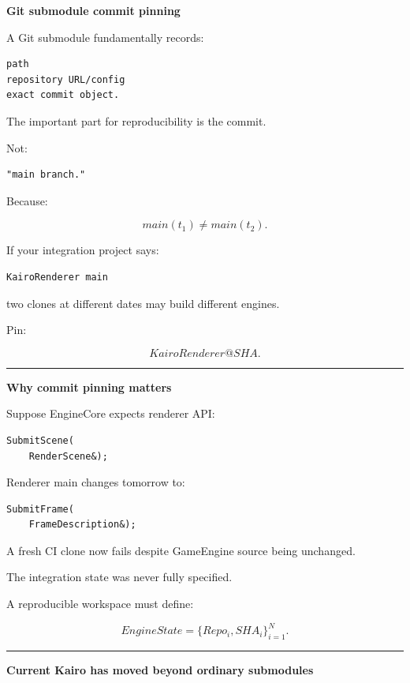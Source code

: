 \textbf{Git submodule commit pinning}

A Git submodule fundamentally records:

\begin{verbatim}
path
repository URL/config
exact commit object.
\end{verbatim}

The important part for reproducibility is the commit.

Not:

\begin{verbatim}
"main branch."
\end{verbatim}

Because:

\[
main(t_1)
\neq
main(t_2).
\]

If your integration project says:

\begin{verbatim}
KairoRenderer main
\end{verbatim}

two clones at different dates may build different engines.

Pin:

\[
KairoRenderer@SHA.
\]

\begin{center}\rule{0.5\linewidth}{0.5pt}\end{center}

\textbf{Why commit pinning matters}

Suppose EngineCore expects renderer API:

\begin{verbatim}
SubmitScene(
    RenderScene&);
\end{verbatim}

Renderer main changes tomorrow to:

\begin{verbatim}
SubmitFrame(
    FrameDescription&);
\end{verbatim}

A fresh CI clone now fails despite GameEngine source being unchanged.

The integration state was never fully specified.

A reproducible workspace must define:

\[
\boxed{
EngineState=
\{Repo_i,SHA_i\}_{i=1}^{N}.
}
\]

\begin{center}\rule{0.5\linewidth}{0.5pt}\end{center}

\textbf{Current Kairo has moved beyond ordinary submodules}

